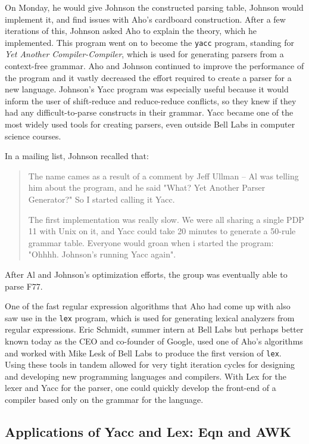 On Monday, he would give Johnson the constructed parsing table, Johnson would implement it,
and find issues with Aho's cardboard construction. After a few iterations of this, Johnson
asked Aho to explain the theory, which he implemented. This program went on to become the
\texttt{yacc} program, standing for \textit{Yet Another Compiler-Compiler}, which is used
for generating parsers from a context-free grammar.
Aho and Johnson continued to improve the performance of the program and it vastly decreased the
effort required to create a parser for a new language.
Johnson's Yacc program was especially useful because it would inform the user of shift-reduce
and reduce-reduce conflicts, so they knew if they had any difficult-to-parse constructs in their
grammar.
Yacc became one of the most widely used tools for creating parsers, even outside Bell Labs
in computer science courses.

In a mailing list, Johnson recalled that:
\begin{quotation}
	The name cames as a result of a comment by Jeff Ullman -- Al was
	telling him about the program,
	and he said "What? Yet Another Parser Generator?"
	So I started calling it Yacc.

	The first implementation was really slow.  We were all sharing a
	single PDP 11 with Unix on it, and
	Yacc could take 20 minutes to generate a 50-rule grammar table.
	Everyone would groan when  i
	started the program: "Ohhhh.  Johnson's running Yacc again".
\end{quotation}

After Al and Johnson's optimization efforts, the group was eventually able to
parse \Gls{F77}.

One of the fast regular expression algorithms that Aho had come up with also saw use in the
\texttt{lex} program, which is used for generating lexical analyzers from regular expressions.
Eric Schmidt, summer intern at Bell Labs but perhaps better known today as the
CEO and co-founder of Google, used one of Aho's algorithms and worked with Mike Lesk of Bell Labs
to produce the first version of \texttt{lex}.
Using these tools in tandem allowed for very tight iteration cycles for designing and
developing new programming languages and compilers. With Lex for the lexer and Yacc for the parser,
one could quickly develop the front-end of a compiler based only on the grammar for the language.

\subsection{Applications of Yacc and Lex: Eqn and AWK}

